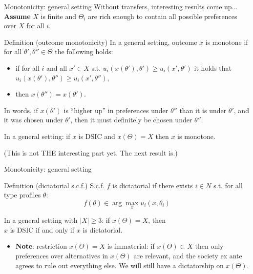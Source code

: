 \documentclass[english,10pt
,aspectratio=169
]{beamer}
\begin{document}
\begin{frame}{Monotonicity: general setting}
	Without transfers, interesting results come up... \\
	\textbf{Assume} $X$ is finite and $\Theta_i$ are rich enough to contain all possible preferences over $X$ for all $i$.
	\begin{exampleblock}{Definition (outcome monotonicity)}
		In a general setting, outcome $x$ is \alert{monotone} if for all $\theta',\theta'' \in \Theta$ the following holds:
		\begin{itemize}
			\item if for all $i$ and all $x' \in X$ s.t. $u_i(x(\theta'),\theta') \geq u_i(x',\theta')$ it holds that $u_i(x(\theta'),\theta'') \geq u_i(x',\theta'')$,
			\item then $x(\theta'')=x(\theta')$.
		\end{itemize}
	\end{exampleblock}
	In words, if $x(\theta')$ is ``higher up'' in preferences under $\theta''$ than it is under $\theta'$, and it was chosen under $\theta'$, then it must definitely be chosen under $\theta''$.
	\begin{theorem}
		In a general setting: if $x$ is DSIC and $x(\Theta)=X$ then $x$ is monotone.
	\end{theorem}
	(This is not THE interesting part yet. The next result is.)
\end{frame}


\begin{frame}{Monotonicity: general setting}
	\begin{exampleblock}{Definition (dictatorial s.c.f.)}
		S.c.f. $f$ is \alert{dictatorial} if there exists $i \in N$ s.t. for all type profiles $\theta$:
		$$ f(\theta) \in \arg \max_x u_i(x,\theta_i)$$
	\end{exampleblock}
	\begin{theorem}
		In a general setting with $|X|\geq 3$: if $x(\Theta)=X$, then\\
		\centering
		$x$ is \alert{DSIC} if and only if $x$ is \alert{dictatorial}.
	\end{theorem}
	\begin{itemize}
		\item \textbf{Note}: restriction $x(\Theta)=X$ is immaterial: if $x(\Theta) \subset X$ then only preferences over alternatives in $x(\Theta)$ are relevant, and the society ex ante agrees to rule out everything else. We will still have a dictatorship on $x(\Theta)$.
	\end{itemize}
\end{frame}
\end{document}
